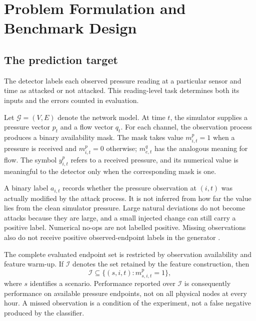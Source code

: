 \chapter{Problem Formulation and Benchmark Design}
\label{ch:benchmark}

\section{The prediction target}
The detector labels each observed pressure reading at a particular sensor and time as attacked or not attacked. This reading-level task determines both its inputs and the errors counted in evaluation.

Let $\mathcal G=(V,E)$ denote the network model. At time $t$, the simulator supplies a pressure vector $p_t$ and a flow vector $q_t$. For each channel, the observation process produces a binary availability mask. The mask takes value $m^p_{i,t}=1$ when a pressure is received and $m^p_{i,t}=0$ otherwise; $m^q_{e,t}$ has the analogous meaning for flow. The symbol $y^p_{i,t}$ refers to a received pressure, and its numerical value is meaningful to the detector only when the corresponding mask is one.

A binary label $a_{i,t}$ records whether the pressure observation at $(i,t)$ was actually modified by the attack process. It is not inferred from how far the value lies from the clean simulator pressure. Large natural deviations do not become attacks because they are large, and a small injected change can still carry a positive label. Numerical no-ops are not labelled positive. Missing observations also do not receive positive observed-endpoint labels in the generator \cite{projectgenerator}.

The complete evaluated endpoint set is restricted by observation availability and feature warm-up. If $\mathcal I$ denotes the set retained by the feature construction, then
\begin{equation}
 \mathcal I\subseteq\{(s,i,t):m^p_{s,i,t}=1\},
\end{equation}
where $s$ identifies a scenario. Performance reported over $\mathcal I$ is consequently performance on available pressure endpoints, not on all physical nodes at every hour. A missed observation is a condition of the experiment, not a false negative produced by the classifier.

